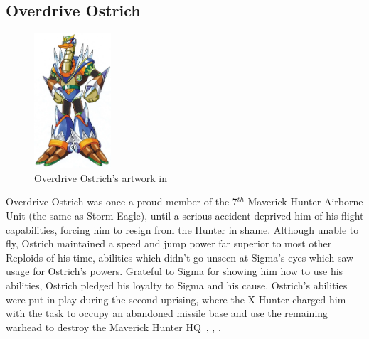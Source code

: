 \subsection{Overdrive Ostrich}\label{boss:Overdrive_ostrich}
\begin{figure}[htp]
	\centering
	\includegraphics[height=5cm]{figures/X2/Overdrive_ostrich/Overdrive_Ostrich.png}
	\caption{Overdrive Ostrich's artwork in \cite{book:MMX_Complete_art}}
\end{figure}
Overdrive Ostrich was once a proud member of the 7$^{th}$ Maverick Hunter Airborne Unit (the same as Storm Eagle), until a serious accident deprived him of his flight capabilities, forcing him to resign from the Hunter in shame. Although unable to fly, Ostrich maintained a speed and jump power far superior to most other Reploids of his time, abilities which didn't go unseen at Sigma's eyes which saw usage for Ostrich's powers. Grateful to Sigma for showing him how to use his abilities, Ostrich pledged his loyalty to Sigma and his cause. Ostrich's abilities were put in play during the second uprising, where the X-Hunter charged him with the task to occupy an abandoned missile base and use the remaining warhead to destroy the Maverick Hunter HQ~\cite{Xcoll1:Manual_X2}, \cite{wayback:X2_resources}, \cite{wiki:Overdrive_Ostrich}.

